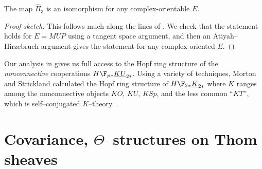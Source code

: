 \begin{corollary}\label{Pi3ForCplxOrientableE}
The map $\hat \Pi_3$ is an isomorphism for any complex-orientable $E$.
\end{corollary}
\begin{proof}[Proof sketch]
This follows much along the lines of .  We check that the statement holds for $E = MUP$ using a tangent space argument, and then an Atiyah--Hirzebruch argument gives the statement for any complex-oriented $E$.
\end{proof}

\begin{remark}
Our analysis in  gives us full access to the Hopf ring structure of the \emph{nonconnective} cooperations $H\F_p{}_* \OS{KU}{2*}$.  Using a variety of techniques, Morton and Strickland calculated the Hopf ring structure of $H\F_2{}_* \OS{K}{2*}$ where $K$ ranges among the nonconnective objects $KO$, $KU$, $KSp$, and the less common ``$KT$'', which is self--conjugated $K$--theory~\cite{Morton,MortonStrickland,StricklandBottPeriodicity}.
\end{remark}










\section{Covariance, \texorpdfstring{$\Theta$}{Theta}--structures on Thom sheaves}

